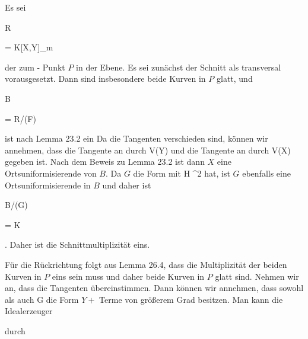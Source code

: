 {


Es sei


\mavergleichskette

{\vergleichskette

{R
}

{ = }{ K[X,Y]_{\mathfrak m}
}

{  }{
}

{    }{
}

{   }{
}

}
{}{}{}
der
zum
 {-} {}Punkt $P$ in der Ebene. Es sei zunächst der Schnitt als transversal vorausgesetzt. Dann sind insbesondere beide Kurven in $P$ glatt, und


\mavergleichskette

{\vergleichskette

{B
}

{ = }{ R/(F)
}

{  }{
}

{    }{
}

{   }{
}

}
{}{}{}
ist nach
Lemma 23.2
ein
Da die Tangenten verschieden sind, können wir annehmen, dass die Tangente an   {  durch  }  { V(Y)   }{ } und die Tangente an   {  durch  }  { V(X)   }{ } gegeben ist. Nach dem Beweis zu
Lemma 23.2
ist dann $X$ eine Ortsuniformisierende von $B$. Da $G$ die Form   {  mit  }  { H ^2   }{ } hat, ist $G$ ebenfalls eine Ortsuniformisierende in $B$ und daher ist


\mavergleichskette

{\vergleichskette

{ B/(G)
}

{ = }{ K
}

{  }{
}

{    }{
}

{   }{
}

}
{}{}{.}
Daher ist die Schnittmultiplizität eins.


Für die Rückrichtung folgt aus
Lemma 26.4,
dass die Multiplizität der beiden Kurven in $P$ eins sein muss und daher beide Kurven in $P$ glatt sind. Nehmen wir an, dass die Tangenten übereinstimmen. Dann können wir annehmen, dass sowohl   {  als auch  }  {  G   }{ } die Form $Y +$ Terme von größerem Grad besitzen. Man kann die Idealerzeuger

 durch

}
